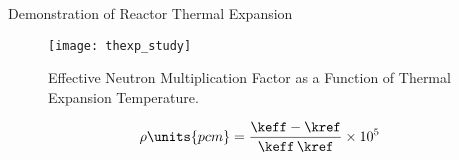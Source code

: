 \begin{frame}{Demonstration of Reactor Thermal Expansion}
  \begin{figure}
    \centering
    \texttt{[image: thexp\_study]}
    \caption{Effective Neutron Multiplication Factor as a Function of 
      Thermal Expansion Temperature.}
    \label{fig:thexp_study}
  \end{figure}
  \begin{equation}
    \label{eq:reactivity_formula}
    \rho \units{pcm} = \frac{\keff - \kref}{\keff \, \kref} \times 10^5
  \end{equation}
\end{frame}
